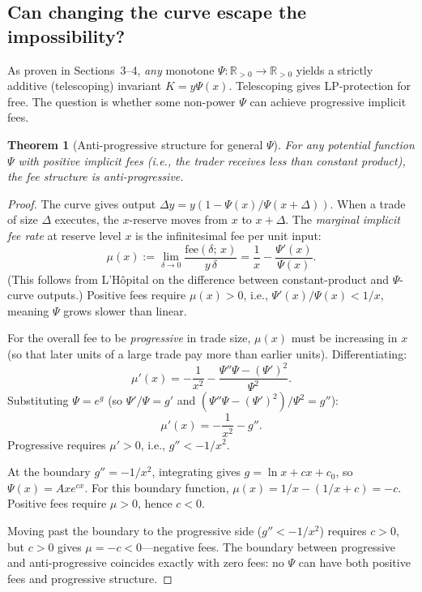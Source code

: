 \documentclass[11pt]{article}
\newtheorem{theorem}{Theorem}[section]
\theoremstyle{definition}
\theoremstyle{remark}
\newcommand{\R}{\mathbb{R}}
\newcommand{\Rp}{\R_{>0}}
\newcommand{\dy}{\Delta y}
\begin{document}
\subsection{Can changing the curve escape the impossibility?}

As proven in Sections~3--4, \emph{any} monotone $\Psi:\Rp\to\Rp$ yields a strictly additive (telescoping) invariant $K=y\Psi(x)$.
Telescoping gives LP-protection for free.
The question is whether some non-power $\Psi$ can achieve progressive implicit fees.

\begin{theorem}[Anti-progressive structure for general $\Psi$]\label{thm:impossibility-general-psi}
For any potential function $\Psi$ with positive implicit fees (i.e., the trader receives less than constant product), the fee structure is anti-progressive.
\end{theorem}

\begin{proof}
The curve gives output $\dy = y(1-\Psi(x)/\Psi(x+\Delta))$.
When a trade of size $\Delta$ executes, the $x$-reserve moves from $x$ to $x+\Delta$.
The \emph{marginal implicit fee rate} at reserve level $x$ is the infinitesimal fee per unit input:
\[
\mu(x) := \lim_{\delta\to 0}\frac{\text{fee}(\delta;\,x)}{y\,\delta}
= \frac{1}{x} - \frac{\Psi'(x)}{\Psi(x)}.
\]
(This follows from L'H\^{o}pital on the difference between constant-product and $\Psi$-curve outputs.)
Positive fees require $\mu(x)>0$, i.e., $\Psi'(x)/\Psi(x) < 1/x$, meaning $\Psi$ grows slower than linear.

For the overall fee to be \emph{progressive} in trade size, $\mu(x)$ must be increasing in $x$ (so that later units of a large trade pay more than earlier units).
Differentiating:
\[
\mu'(x) = -\frac{1}{x^2} - \frac{\Psi''\Psi - (\Psi')^2}{\Psi^2}.
\]
Substituting $\Psi=e^g$ (so $\Psi'/\Psi=g'$ and $(\Psi''\Psi-(\Psi')^2)/\Psi^2 = g''$):
\[
\mu'(x) = -\frac{1}{x^2} - g''.
\]
Progressive requires $\mu'>0$, i.e., $g'' < -1/x^2$.

At the boundary $g''=-1/x^2$, integrating gives $g=\ln x + cx + c_0$, so $\Psi(x)=Axe^{cx}$.
For this boundary function, $\mu(x) = 1/x - (1/x + c) = -c$.
Positive fees require $\mu>0$, hence $c<0$.

Moving past the boundary to the progressive side ($g'' < -1/x^2$) requires $c>0$, but $c>0$ gives $\mu = -c < 0$---negative fees.
The boundary between progressive and anti-progressive coincides exactly with zero fees: no $\Psi$ can have both positive fees and progressive structure.
\end{proof}
\end{document}
